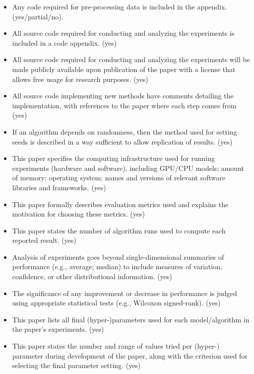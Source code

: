 \begin{itemize}
\item Any code required for pre-processing data is included in the appendix. (yes/partial/no).
\item All source code required for conducting and analyzing the experiments is included in a code appendix. (yes)
\item All source code required for conducting and analyzing the experiments will be made publicly available upon publication of the paper with a license that allows free usage for research purposes. (yes)
\item All source code implementing new methods have comments detailing the implementation, with references to the paper where each step comes from (yes)
\item If an algorithm depends on randomness, then the method used for setting seeds is described in a way sufficient to allow replication of results. (yes)
\item This paper specifies the computing infrastructure used for running experiments (hardware and software), including GPU/CPU models; amount of memory; operating system; names and versions of relevant software libraries and frameworks. (yes)
\item This paper formally describes evaluation metrics used and explains the motivation for choosing these metrics. (yes)
\item This paper states the number of algorithm runs used to compute each reported result. (yes)
\item Analysis of experiments goes beyond single-dimensional summaries of performance (e.g., average; median) to include measures of variation, confidence, or other distributional information. (yes)
\item The significance of any improvement or decrease in performance is judged using appropriate statistical tests (e.g., Wilcoxon signed-rank). (yes)
\item This paper lists all final (hyper-)parameters used for each model/algorithm in the paper’s experiments. (yes)
\item This paper states the number and range of values tried per (hyper-) parameter during development of the paper, along with the criterion used for selecting the final parameter setting. (yes)
\end{itemize}